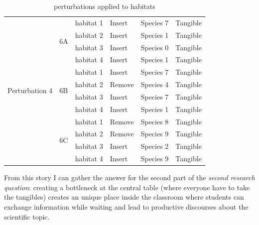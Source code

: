 \begin{table}
\begin{tabular}{ | l | l | l | l | l | l | }
\hline
\multirow{12}{*}{Perturbation 4} & \multirow{4}{*}{6A} & habitat 1 & Insert & Species 7 & Tangible \\
 & & habitat 2 & Insert & Species 1 & Tangible \\
 & & habitat 3 & Insert & Species 0 & Tangible \\
 & & habitat 4 & Insert & Species 1 & Tangible \\
\cline{2-6}
 & \multirow{4}{*}{6B} & habitat 1 & Insert & Species 7 & Tangible \\
 & & habitat 2 & Remove & Species 4 & Tangible \\
 & & habitat 3 & Insert & Species 7 & Tangible \\
 & & habitat 4 & Insert & Species 1 & Tangible \\ 
\cline{2-6}
 & \multirow{4}{*}{6C} & habitat 1 & Remove & Species 8 & Tangible \\
 & & habitat 2 & Remove & Species 9 & Tangible \\
 & & habitat 3 & Insert & Species 2 & Tangible \\
 & & habitat 4 & Insert & Species 9 & Tangible \\ 
\hline
\end{tabular}
\caption{perturbations applied to habitats}
\label{tab:perturbations}
\end{table}

From this story I can gather the answer for the second part of the \textit{second research question}: creating a bottleneck at the central table (where everyone have to take the tangibles) creates an unique place inside the classroom where students can exchange information while waiting and lead to productive discourses about the scientific topic.

